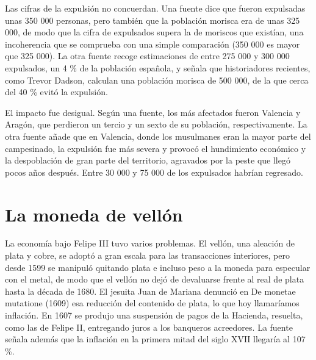 \documentclass{book}
\begin{document}

Las cifras de la expulsión no concuerdan. Una fuente dice que fueron expulsadas unas 350 000 personas, pero también que la población morisca era de unas 325 000, de modo que la cifra de expulsados supera la de moriscos que existían, una incoherencia que se comprueba con una simple comparación (350 000 es mayor que 325 000). La otra fuente recoge estimaciones de entre 275 000 y 300 000 expulsados, un 4 \% de la población española, y señala que historiadores recientes, como Trevor Dadson, calculan una población morisca de 500 000, de la que cerca del 40 \% evitó la expulsión.


El impacto fue desigual. Según una fuente, los más afectados fueron Valencia y Aragón, que perdieron un tercio y un sexto de su población, respectivamente. La otra fuente añade que en Valencia, donde los musulmanes eran la mayor parte del campesinado, la expulsión fue más severa y provocó el hundimiento económico y la despoblación de gran parte del territorio, agravados por la peste que llegó pocos años después. Entre 30 000 y 75 000 de los expulsados habrían regresado.


\section{La moneda de vellón}

La economía bajo Felipe III tuvo varios problemas. El vellón, una aleación de plata y cobre, se adoptó a gran escala para las transacciones interiores, pero desde 1599 se manipuló quitando plata e incluso peso a la moneda para especular con el metal, de modo que el vellón no dejó de devaluarse frente al real de plata hasta la década de 1680. El jesuita Juan de Mariana denunció en De monetae mutatione (1609) esa reducción del contenido de plata, lo que hoy llamaríamos inflación. En 1607 se produjo una suspensión de pagos de la Hacienda, resuelta, como las de Felipe II, entregando juros a los banqueros acreedores. La fuente señala además que la inflación en la primera mitad del siglo XVII llegaría al 107 \%.
\end{document}
